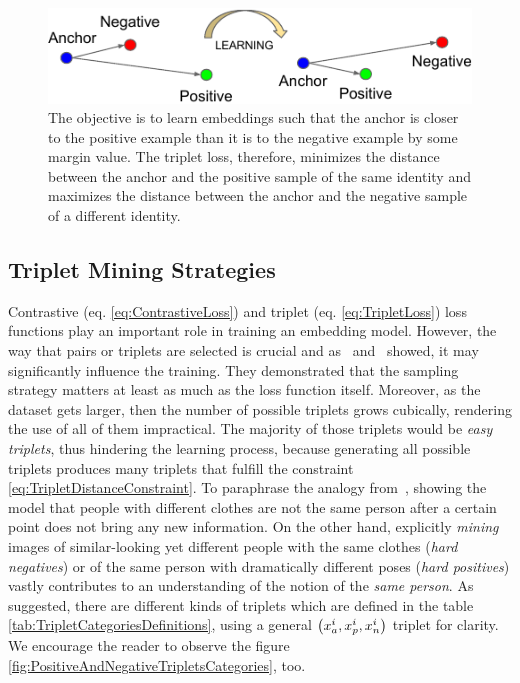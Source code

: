 \begin{figure}[t]
    \centerline{\includegraphics[width=0.7\linewidth]{figures/theoretical_foundations/triplet_loss_learning_process.pdf}}
    \caption[Triplet loss learning]{The objective is to learn embeddings such that the anchor is closer to the positive example than it is to the negative example by some margin value. The triplet loss, therefore, minimizes the distance between the anchor and the positive sample of the same identity and maximizes the distance between the anchor and the negative sample of a different identity. }
    \label{fig:TripletLossLearningProcess}
\end{figure}

\subsection{Triplet Mining Strategies}
\label{ssec:TripletMiningStrategies}

Contrastive (eq. \ref{eq:ContrastiveLoss}) and triplet (eq. \ref{eq:TripletLoss}) loss functions play an important role in training an embedding model. However, the way that pairs or triplets are selected is crucial and as~\cite{Hermans2017} and~\cite{Manmatha2017} showed, it may significantly influence the training. They demonstrated that the sampling strategy matters at least as much as the loss function itself. Moreover, as the dataset gets larger, then the number of possible triplets grows cubically, rendering the use of all of them impractical. The majority of those triplets would be \emph{easy triplets}, thus hindering the learning process, because generating all possible triplets produces many triplets that fulfill the constraint \ref{eq:TripletDistanceConstraint}. To paraphrase the analogy from~\cite{Hermans2017}, showing the model that people with different clothes are not the same person after a certain point does not bring any new information. On the other hand, explicitly \emph{mining} images of similar-looking yet different people with the same clothes (\emph{hard negatives}) or of the same person with dramatically different poses (\emph{hard positives}) vastly contributes to an understanding of the notion of the \emph{same person}. As suggested, there are different kinds of triplets which are defined in the table \ref{tab:TripletCategoriesDefinitions}, using a general $\left( {x_a^i, x_p^i, x_n^i} \right)$ triplet for clarity. We encourage the reader to observe the figure \ref{fig:PositiveAndNegativeTripletsCategories}, too.

